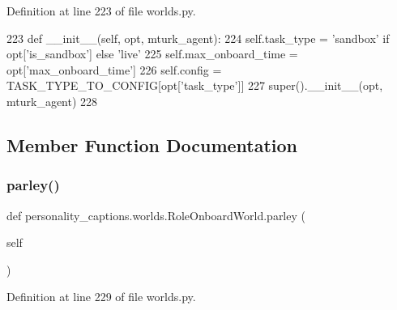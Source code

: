 Definition at line 223 of file worlds.\+py.


\begin{DoxyCode}
223     \textcolor{keyword}{def }\_\_init\_\_(self, opt, mturk\_agent):
224         self.task\_type = \textcolor{stringliteral}{'sandbox'} \textcolor{keywordflow}{if} opt[\textcolor{stringliteral}{'is\_sandbox'}] \textcolor{keywordflow}{else} \textcolor{stringliteral}{'live'}
225         self.max\_onboard\_time = opt[\textcolor{stringliteral}{'max\_onboard\_time'}]
226         self.config = TASK\_TYPE\_TO\_CONFIG[opt[\textcolor{stringliteral}{'task\_type'}]]
227         super().\_\_init\_\_(opt, mturk\_agent)
228 
\end{DoxyCode}


\subsection{Member Function Documentation}
\mbox{\label{classpersonality__captions_1_1worlds_1_1RoleOnboardWorld_aa3a44bacf2761f813788a08dd918965d}} 
\subsubsection{\texorpdfstring{parley()}{parley()}}
{\footnotesize\ttfamily def personality\+\_\+captions.\+worlds.\+Role\+Onboard\+World.\+parley (\begin{DoxyParamCaption}\item[{}]{self }\end{DoxyParamCaption})}



Definition at line 229 of file worlds.\+py.


